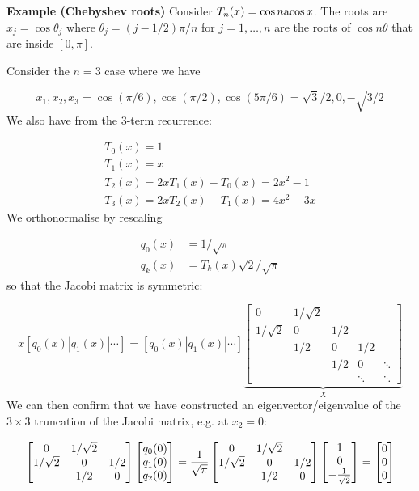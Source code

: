 \documentclass[12pt,a4paper]{article}
\begin{document}
\textbf{Example (Chebyshev roots)} Consider $T_n(x) = \cos n {\rm acos}\, x$. The roots  are $x_j = \cos \ensuremath{\theta}_j$ where $\ensuremath{\theta}_j = (j-1/2)\ensuremath{\pi}/n$ for $j = 1,\ensuremath{\ldots},n$ are the roots of $\cos n \ensuremath{\theta}$ that are inside $[0,\ensuremath{\pi}]$. 

Consider the $n = 3$ case where we have

\[
x_1,x_2,x_3 = \cos(\ensuremath{\pi}/6),\cos(\ensuremath{\pi}/2),\cos(5\ensuremath{\pi}/6) = \sqrt{3}/2,0,-\sqrt{3/2}
\]
We also have from the 3-term recurrence:


\begin{align*}
T_0(x) = 1 \\
T_1(x) = x \\
T_2(x) = 2x T_1(x) - T_0(x) = 2x^2-1 \\
T_3(x) = 2x T_2(x) - T_1(x) = 4x^2-3x
\end{align*}
We orthonormalise by rescaling


\begin{align*}
q_0(x) &= 1/\sqrt{\ensuremath{\pi}} \\
q_k(x) &= T_k(x) \sqrt{2}/\sqrt{\ensuremath{\pi}}
\end{align*}
so that the Jacobi matrix is symmetric:

\[
x [q_0(x)|q_1(x)|\ensuremath{\cdots}] = [q_0(x)|q_1(x)|\ensuremath{\cdots}] \underbrace{\begin{bmatrix} 0 & 1/\sqrt{2} \\
                            1/\sqrt{2} & 0 & 1/2 \\
                            &1/2 & 0 & 1/2 \\
                             &   & 1/2 & 0 & \ensuremath{\ddots} \\
                              &  && \ensuremath{\ddots} & \ensuremath{\ddots}
\end{bmatrix}}_X
\]
We can then confirm that we have constructed an eigenvector/eigenvalue of the $3 \ensuremath{\times} 3$ truncation of the Jacobi matrix, e.g. at $x_2 = 0$:

\[
\begin{bmatrix} 
0 & 1/\sqrt{2} \\
1/\sqrt{2} & 0 & 1/2 \\
    & 1/2 & 0\end{bmatrix} \begin{bmatrix} q_0(0) \\ q_1(0) \\ q_2(0) 
    \end{bmatrix} = {1 \over \sqrt \ensuremath{\pi}} \begin{bmatrix} 
0 & 1/\sqrt{2} \\
1/\sqrt{2} & 0 & 1/2 \\
    & 1/2 & 0\end{bmatrix} \begin{bmatrix} 1 \\ 0 \\ -{1 \over \sqrt{2}}
    \end{bmatrix} =\begin{bmatrix} 0 \\ 0 \\ 0
    \end{bmatrix}
\]
\end{document}
